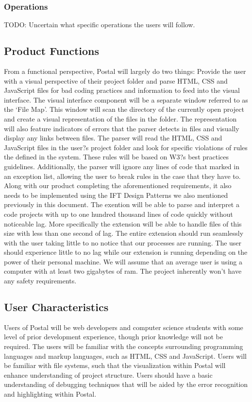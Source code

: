 \documentclass[letterpaper,10pt,titlepage,draftclsnofoot,onecolumn,onesided] {IEEEtran}
\begin{document}
\subsubsection{Operations}
TODO: Uncertain what specific operations the users will follow.

\subsection{Product Functions}
From a functional perspective, Postal will largely do two things: Provide the user with a visual perspective of their project folder and parse HTML, CSS and JavaScript files for bad coding practices and information to feed into the visual interface. 
The visual interface component will be a separate window referred to as the `File Map'. This window will scan the directory of the currently open project and create a visual representation of the files in the folder. The representation will also feature indicators of errors that the parser detects in files and visually display any links between files.
The parser will read the HTML, CSS and JavaScript files in the user?s project folder and look for specific violations of rules the defined in the system. These rules will be based on W3?s best practices guidelines. Additionally, the parser will ignore any lines of code that marked in an exception list, allowing the user to break rules in the case that they have to.
Along with our product completing the aforementioned requirements, it also needs to be implemented using the IFT Design Patterns we also mentioned previously in this document.
The exention will be able to parse and interpret a code projects with up to one hundred thousand lines of code quickly without noticeable lag. 
More specifically the extension will be able to handle files of this size with less than one second of lag.
The entire extension should run seamlessly with the user taking little to no notice that our processes are running. 
The user should experience little to no lag while our extension is running depending on the power of their personal machine.
We will assume that an average user is using a computer with at least two gigabytes of ram. 
The project inherently won't have any safety requirements. 

\subsection{User Characteristics}
Users of Postal will be web developers and computer science students with some level of prior development experience, though prior knowledge will not be required. The users will be familiar with the concepts surrounding programming languages and markup languages, such as HTML, CSS and JavaScript. 
Users will be familiar with file systems, such that the visualization within Postal will enhance understanding of project structure. 
Users should have a basic understanding of debugging techniques that will be aided by the error recognition and highlighting within Postal.
\end{document}
